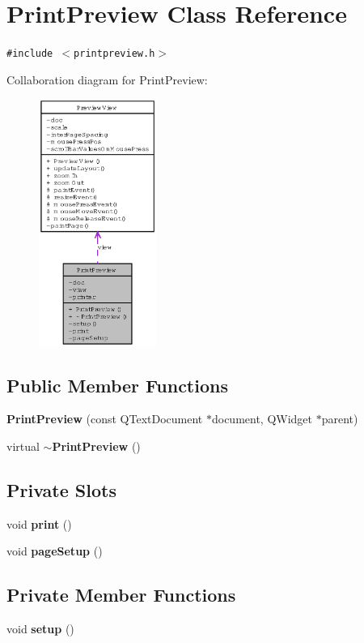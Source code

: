 \section{Print\-Preview Class Reference}
\label{classPrintPreview}
{\tt \#include $<$printpreview.h$>$}

Collaboration diagram for Print\-Preview:\begin{figure}[H]
\begin{center}
\leavevmode
\includegraphics[width=109pt]{classPrintPreview__coll__graph}
\end{center}
\end{figure}
\subsection*{Public Member Functions}
\begin{CompactItemize}
\item 
{\bf Print\-Preview} (const QText\-Document $\ast$document, QWidget $\ast$parent)
\item 
virtual {\bf $\sim$Print\-Preview} ()
\end{CompactItemize}
\subsection*{Private Slots}
\begin{CompactItemize}
\item 
void {\bf print} ()
\item 
void {\bf page\-Setup} ()
\end{CompactItemize}
\subsection*{Private Member Functions}
\begin{CompactItemize}
\item 
void {\bf setup} ()
\end{CompactItemize}
